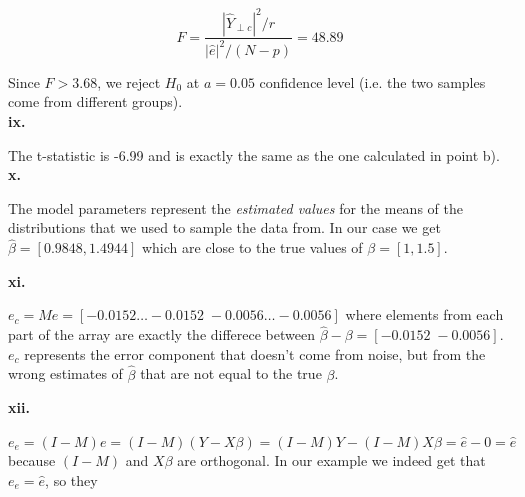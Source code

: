 \documentclass[12pt,a4paper,oneside]{report}
\begin{document}
$$F = \frac{|\hat{Y}_{\perp c}|^2 / r}{|\hat{e}|^2 / (N - p)} = 48.89$$

Since $F > 3.68$, we reject $H_0$ at $a = 0.05$ confidence level (i.e. the two samples come from different groups).\\

\textbf{ix.}

The t-statistic is -6.99 and is exactly the same as the one calculated in point b). \\

\textbf{x. }

The model parameters represent the \emph{estimated values} for the means of the distributions that we used to sample the data from. In our case we get $\hat{\beta} = [0.9848, 1.4944]$ which are close to the true values of $\beta = [1, 1.5]$.

\textbf{xi. }

$e_c = M e = [-0.0152 \dots -0.0152 \; -0.0056 \dots -0.0056 ]$ where elements from each part of the array are exactly the differece between $\hat{\beta} - \beta = [-0.0152 \; -0.0056]$. $e_c$ represents the error component that doesn't come from noise, but from the wrong estimates of $\hat{\beta}$ that are not equal to the true $\beta$.

\textbf{xii. }

$e_e = (I - M) e = (I - M) (Y - X\beta) = (I - M)Y - (I - M)X\beta = \hat{e} - 0 = \hat{e}$ because $(I-M)$ and $X\beta$ are orthogonal. In our example we indeed get that $e_e = \hat{e}$, so they 
\end{document}
